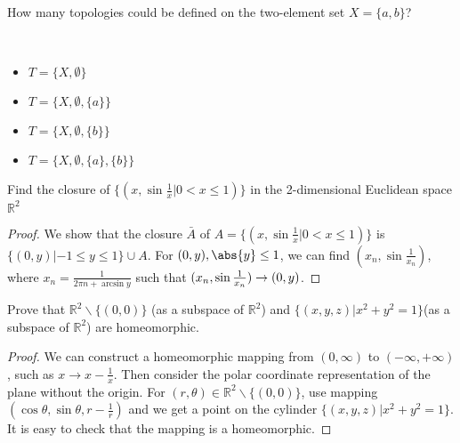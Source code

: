 \begin{problem}
How many topologies could be defined on the two-element set $X=\{a,b\}$?
\end{problem}
\begin{solution}
\quad\\
\begin{itemize}
\item $T=\{X,\emptyset\}$
\item $T=\{X,\emptyset,\{a\}\}$
\item $T=\{X,\emptyset,\{b\}\}$
\item $T=\{X,\emptyset,\{a\},\{b\}\}$
\end{itemize}
\end{solution}

\begin{problem}
Find the closure of $\{(x,\sin \frac{1}{x}| 0<x\leq 1)\}$ in the 2-dimensional Euclidean space $\mathbb{R}^2$
\end{problem}
\begin{solution}
\begin{proof}%
We show that the closure $\bar{A}$ of $A=\{(x,\sin \frac{1}{x}| 0<x\leq 1)\}$ is $ \{(0,y)|-1\leq y\leq 1\}\cup A$.
For $(0,y),\abs{y}\leq 1$, we can find $(x_n,\sin\frac{1}{x_n})$, where $x_n=\frac{1}{2\pi n +\arcsin y}$ such that $(x_n,\sin {1\over x_n}) \to (0,y)$.
\end{proof}
\end{solution}

\begin{problem}
Prove that $\mathbb{R}^2\backslash\{(0,0)\}$ (as a subspace of $\mathbb{R}^2$) and $\{(x,y,z)|x^2+y^2=1\}$(as a subspace of $\mathbb{R}^2$) are homeomorphic.
\end{problem}
\begin{solution}
\begin{proof}
We can construct a homeomorphic mapping from  $(0,\infty)$ to $(-\infty,+\infty)$, such as $x\to x-\frac{1}{x}$. Then consider the polar coordinate representation of the plane without the origin. For $(r,\theta)  \in \mathbb{R}^2\backslash\{(0,0)\}$, use mapping $(\cos\theta,\sin\theta,r-\frac{1}{r})$ and we get a point on the cylinder $\{(x,y,z)|x^2+y^2=1\}$. It is easy to check that the mapping is a homeomorphic.
\end{proof}
\end{solution}

